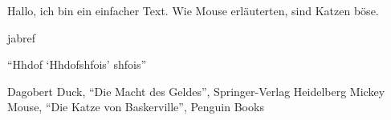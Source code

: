 \documentclass[12pt,ngerman]{scrartcl}
\begin{document}
Hallo, ich bin ein einfacher Text. Wie Mouse \cite{mouse} erläuterten, sind Katzen böse.

jabref

\enquote{Hhdof \enquote{Hhdofshfois} shfois}


\begin{thebibliography}{9}
 Dagobert Duck, \enquote{Die Macht des Geldes}, Springer-Verlag Heidelberg
 Mickey Mouse, \enquote{Die Katze von Baskerville}, Penguin Books
\end{thebibliography}
\end{document}
